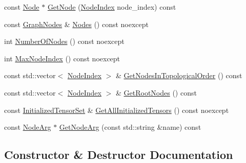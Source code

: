 \begin{DoxyCompactItemize}
\item 
const \mbox{\hyperlink{classonnxruntime_1_1Node}{Node}} $\ast$ \mbox{\hyperlink{classonnxruntime_1_1GraphViewer_a28c2a2c0c9ef24a4b62ef2de888d849b}{Get\+Node}} (\mbox{\hyperlink{namespaceonnxruntime_af8773b5c12b5d8fd9292eb2e268df760}{Node\+Index}} node\+\_\+index) const
\item 
const \mbox{\hyperlink{classonnxruntime_1_1GraphNodes}{Graph\+Nodes}} \& \mbox{\hyperlink{classonnxruntime_1_1GraphViewer_ab4f10284fb8bee8eae31bbeb8197fd63}{Nodes}} () const noexcept
\item 
int \mbox{\hyperlink{classonnxruntime_1_1GraphViewer_aecfc743ec5d8e4a5209b7a43b32c8e1d}{Number\+Of\+Nodes}} () const noexcept
\item 
int \mbox{\hyperlink{classonnxruntime_1_1GraphViewer_a4d19d0ffa0b5f8b3abe7430cbb5c3b32}{Max\+Node\+Index}} () const noexcept
\item 
const std\+::vector$<$ \mbox{\hyperlink{namespaceonnxruntime_af8773b5c12b5d8fd9292eb2e268df760}{Node\+Index}} $>$ \& \mbox{\hyperlink{classonnxruntime_1_1GraphViewer_aca9d5071746718e647bb49d7852e89c0}{Get\+Nodes\+In\+Topological\+Order}} () const
\item 
const std\+::vector$<$ \mbox{\hyperlink{namespaceonnxruntime_af8773b5c12b5d8fd9292eb2e268df760}{Node\+Index}} $>$ \& \mbox{\hyperlink{classonnxruntime_1_1GraphViewer_a9167351a5042b3e2583be502eb2b9f95}{Get\+Root\+Nodes}} () const
\item 
const \mbox{\hyperlink{namespaceonnxruntime_a80c06ce917adca79f4a9c0f9ad3147f8}{Initialized\+Tensor\+Set}} \& \mbox{\hyperlink{classonnxruntime_1_1GraphViewer_a59a4a35d0f17ba72ac2ce572b44ece72}{Get\+All\+Initialized\+Tensors}} () const noexcept
\item 
const \mbox{\hyperlink{classonnxruntime_1_1NodeArg}{Node\+Arg}} $\ast$ \mbox{\hyperlink{classonnxruntime_1_1GraphViewer_aec62375d2610b79f37bf00cd8895ec1c}{Get\+Node\+Arg}} (const std\+::string \&name) const
\end{DoxyCompactItemize}


\subsection{Constructor \& Destructor Documentation}
\mbox{\label{classonnxruntime_1_1GraphViewer_a1e00fee3a376800a386a9ff632785e60}} 
